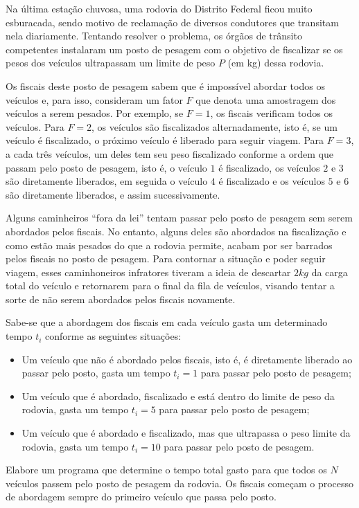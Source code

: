 Na última estação chuvosa, uma rodovia do Distrito Federal ficou muito esburacada, sendo motivo de reclamação de diversos condutores que transitam nela diariamente. Tentando resolver o problema, os órgãos de trânsito competentes instalaram um posto de pesagem com o objetivo de fiscalizar se os pesos dos veículos ultrapassam um limite de peso $P$ (em kg) dessa rodovia.

Os fiscais deste posto de pesagem sabem que é impossível abordar todos os veículos e, para isso, consideram um fator $F$ que denota uma amostragem dos veículos a serem pesados. Por exemplo, se $F=1$, os fiscais verificam todos os veículos. Para $F=2$, os veículos são fiscalizados alternadamente, isto é, se um veículo é fiscalizado, o próximo veículo é liberado para seguir viagem. Para $F=3$, a cada três veículos, um deles tem seu peso fiscalizado conforme a ordem que passam pelo posto de pesagem, isto é, o veículo $1$ é fiscalizado, os veículos $2$ e $3$ são diretamente liberados, em seguida o veículo $4$ é fiscalizado e os veículos $5$ e $6$ são diretamente liberados, e assim sucessivamente.

Alguns caminheiros ``fora da lei'' tentam passar pelo posto de pesagem sem serem abordados pelos fiscais. No entanto, alguns deles são abordados na fiscalização e como estão mais pesados do que a rodovia permite, acabam por ser barrados pelos fiscais no posto de pesagem. Para contornar a situação e poder seguir viagem, esses caminhoneiros infratores tiveram a ideia de descartar $2kg$ da carga total do veículo e retornarem para o final da fila de veículos, visando tentar a sorte de não serem abordados pelos fiscais novamente.

Sabe-se que a abordagem dos fiscais em cada veículo gasta um determinado tempo $t_i$ conforme as seguintes situações:

\begin{itemize}
\item Um veículo que não é abordado pelos fiscais, isto é, é diretamente liberado ao passar pelo posto, gasta um tempo $t_i=1$ para passar pelo posto de pesagem;
\item Um veículo que é abordado, fiscalizado e está dentro do limite de peso da rodovia, gasta um tempo $t_i=5$ para passar pelo posto de pesagem;
\item Um veículo que é abordado e fiscalizado, mas que ultrapassa o peso limite da rodovia, gasta um tempo $t_i=10$ para passar pelo posto de pesagem.
\end{itemize}

Elabore um programa que determine o tempo total gasto para que todos os $N$ veículos passem pelo posto de pesagem da rodovia. Os fiscais começam o processo de abordagem sempre do primeiro veículo que passa pelo posto.
